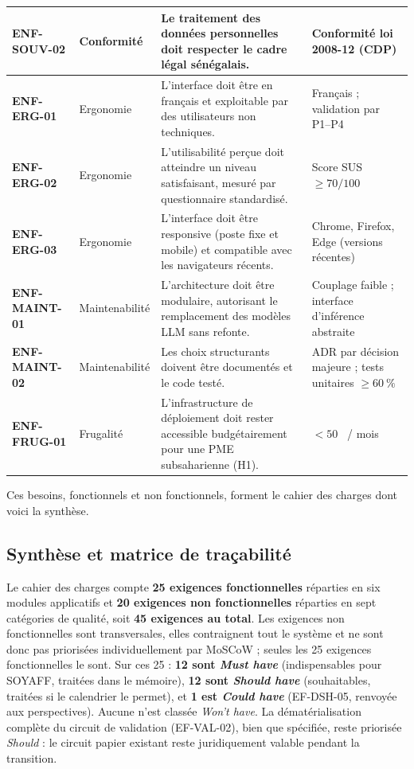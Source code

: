 \begin{longtable}{|>{\raggedright\arraybackslash}p{2.0cm}|>{\raggedright\arraybackslash}p{2.3cm}|>{\raggedright\arraybackslash}p{5.3cm}|>{\raggedright\arraybackslash}p{2.8cm}|}
\textbf{ENF-SOUV-02} & Conformité & Le traitement des données personnelles doit respecter le cadre légal sénégalais. & Conformité loi 2008-12 (CDP) \\ \hline
\textbf{ENF-ERG-01} & Ergonomie & L'interface doit être en français et exploitable par des utilisateurs non techniques. & Français ; validation par P1--P4 \\ \hline
\textbf{ENF-ERG-02} & Ergonomie & L'utilisabilité perçue doit atteindre un niveau satisfaisant, mesuré par questionnaire standardisé. & Score SUS $\geq 70/100$ \\ \hline
\textbf{ENF-ERG-03} & Ergonomie & L'interface doit être responsive (poste fixe et mobile) et compatible avec les navigateurs récents. & Chrome, Firefox, Edge (versions récentes) \\ \hline
\textbf{ENF-MAINT-01} & Maintenabilité & L'architecture doit être modulaire, autorisant le remplacement des modèles LLM sans refonte. & Couplage faible ; interface d'inférence abstraite \\ \hline
\textbf{ENF-MAINT-02} & Maintenabilité & Les choix structurants doivent être documentés et le code testé. & ADR par décision majeure ; tests unitaires $\geq 60~\%$ \\ \hline
\textbf{ENF-FRUG-01} & Frugalité & L'infrastructure de déploiement doit rester accessible budgétairement pour une PME subsaharienne (H1). & $< 50$~\texteuro{} / mois \\ \hline
\end{longtable}

Ces besoins, fonctionnels et non fonctionnels, forment le cahier des charges dont voici la synthèse.

\subsection{Synthèse et matrice de traçabilité}
\label{sec:synthese_tracabilite}
Le cahier des charges compte \textbf{25 exigences fonctionnelles} réparties en six modules applicatifs et \textbf{20 exigences non fonctionnelles} réparties en sept catégories de qualité, soit \textbf{45 exigences au total}. Les exigences non fonctionnelles sont transversales, elles contraignent tout le système et ne sont donc pas priorisées individuellement par MoSCoW ; seules les 25 exigences fonctionnelles le sont. Sur ces 25 : \textbf{12 sont \textit{Must have}} (indispensables pour SOYAFF, traitées dans le mémoire), \textbf{12 sont \textit{Should have}} (souhaitables, traitées si le calendrier le permet), et \textbf{1 est \textit{Could have}} (EF-DSH-05, renvoyée aux perspectives). Aucune n'est classée \textit{Won't have}. La dématérialisation complète du circuit de validation (EF-VAL-02), bien que spécifiée, reste priorisée \textit{Should} : le circuit papier existant reste juridiquement valable pendant la transition.

